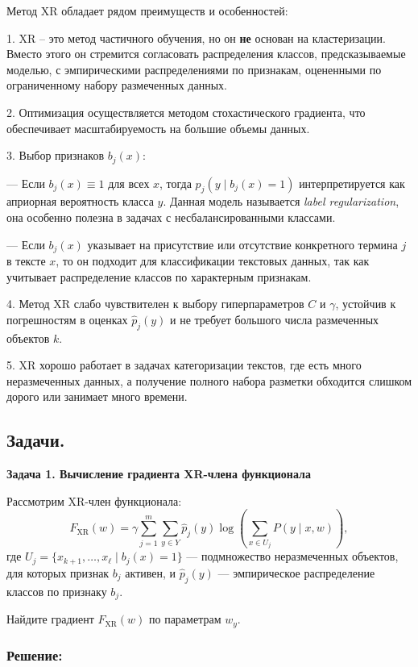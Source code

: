 Метод XR обладает рядом преимуществ и особенностей:

1. XR – это метод частичного обучения, но он \textbf{не} основан на кластеризации. Вместо этого он стремится согласовать распределения классов, предсказываемые моделью, с эмпирическими распределениями по признакам, оцененными по ограниченному набору размеченных данных.

2. Оптимизация осуществляется методом стохастического градиента, что обеспечивает масштабируемость на большие объемы данных.

3. Выбор признаков $b_j(x)$:

--- Если $b_j(x) \equiv 1$ для всех $x$, тогда $p_j(y \mid b_j(x)=1)$ интерпретируется как априорная вероятность класса $y$. Данная модель называется \textit{label regularization}, она особенно полезна в задачах с несбалансированными классами.

--- Если $b_j(x)$ указывает на присутствие или отсутствие конкретного термина $j$ в тексте $x$, то он подходит для классификации текстовых данных, так как учитывает распределение классов по характерным признакам.

4. Метод XR слабо чувствителен к выбору гиперпараметров $C$ и $\gamma$, устойчив к погрешностям в оценках $\hat{p}_j(y)$ и не требует большого числа размеченных объектов $k$.

5. XR хорошо работает в задачах категоризации текстов, где есть много неразмеченных данных, а получение полного набора разметки обходится слишком дорого или занимает много времени.

\subsection{Задачи.}

\bigskip

\noindent\textbf{Задача 1. Вычисление градиента XR-члена функционала}

Рассмотрим XR-член функционала:
\[
F_{\text{XR}}(w) = \gamma \sum_{j=1}^m \sum_{y \in Y} \hat{p}_j(y) \log\left(\sum_{x \in U_j} P(y \mid x,w)\right),
\]
где $U_j = \{ x_{k+1}, \ldots, x_{\ell} \mid b_j(x)=1 \}$ — подмножество неразмеченных объектов, для которых признак $b_j$ активен, и $\hat{p}_j(y)$ — эмпирическое распределение классов по признаку $b_j$.

Найдите градиент $F_{\text{XR}}(w)$ по параметрам $w_y$.

\subsubsection*{Решение:}

